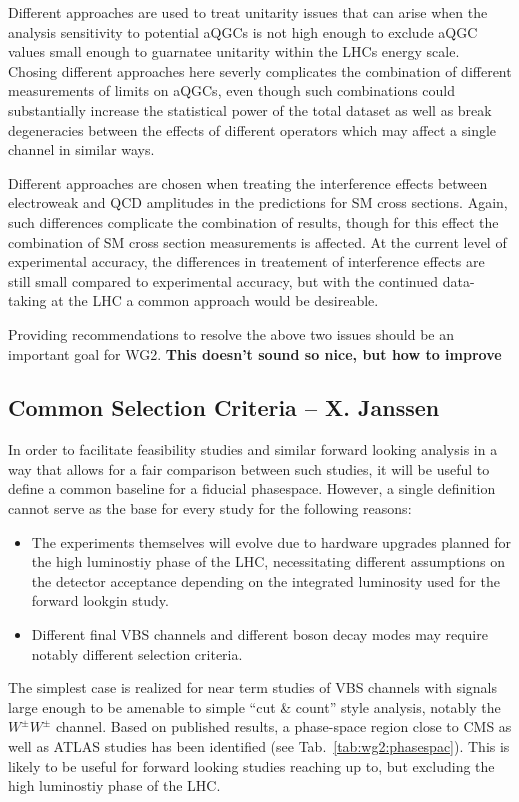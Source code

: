 Different approaches are used to treat unitarity issues that can arise when the analysis sensitivity to potential aQGCs is not high enough to exclude aQGC values small enough to guarnatee unitarity within the LHCs energy scale. Chosing different approaches here severly complicates the combination of different measurements of limits on aQGCs, even though such combinations could substantially increase the statistical power of the total dataset as well as break degeneracies between the effects of different operators which may affect a single channel in similar ways.

Different approaches are chosen when treating the interference effects between electroweak and QCD amplitudes in the predictions for SM cross sections. Again, such differences complicate the combination of results, though for this effect the combination of SM cross section measurements is affected. At the current level of experimental accuracy, the differences in treatement of interference effects are still small compared to experimental accuracy, but with the continued data-taking at the LHC a common approach would be desireable. 

Providing recommendations to resolve the above two issues should be an important goal for WG2. {\bf This doesn't sound so nice, but how to improve}

\subsection{Common Selection Criteria -- X. Janssen}

In order to facilitate feasibility studies and similar forward looking analysis in a way that allows for a fair comparison between such studies, it will be useful to define a common baseline for a fiducial phasespace. However, a single definition cannot serve as the base for every study for the following reasons:
\begin{itemize}
\item The experiments themselves will evolve due to hardware upgrades planned for the high luminostiy phase of the LHC, necessitating different assumptions on the detector acceptance depending on the integrated luminosity used for the forward lookgin study.
\item Different final VBS channels and different boson decay modes may require notably different selection criteria.
\end{itemize}

The simplest case is realized for near term studies of VBS channels with signals large enough to be amenable to simple ``cut \& count'' style analysis, notably the $W^\pm W^\pm$ channel. Based on published results, a phase-space region close to CMS as well as ATLAS studies has been identified (see Tab.~\ref{tab:wg2:phasespac}). This is likely to be useful for forward looking studies reaching up to, but excluding the high luminostiy phase of the LHC.

